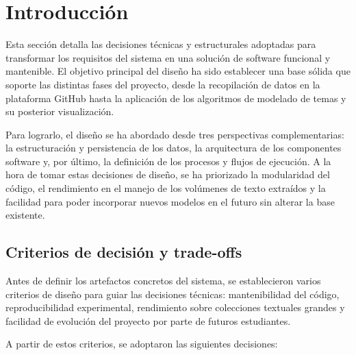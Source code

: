 
\section{Introducción}
Esta sección detalla las decisiones técnicas y estructurales adoptadas para
transformar los requisitos del sistema en una solución de software funcional y
mantenible. El objetivo principal del diseño ha sido establecer una base sólida
que soporte las distintas fases del proyecto, desde la recopilación de datos en
la plataforma GitHub hasta la aplicación de los algoritmos de modelado de temas
y su posterior visualización.

Para lograrlo, el diseño se ha abordado desde tres perspectivas
complementarias: la estructuración y persistencia de los datos, la arquitectura
de los componentes software y, por último, la definición de los procesos y
flujos de ejecución. A la hora de tomar estas decisiones de diseño, se ha
priorizado la modularidad del código, el rendimiento en el manejo de los
volúmenes de texto extraídos y la facilidad para poder incorporar nuevos
modelos en el futuro sin alterar la base existente.

\subsection{Criterios de decisión y trade-offs}
Antes de definir los artefactos concretos del sistema, se establecieron varios
criterios de diseño para guiar las decisiones técnicas: mantenibilidad del
código, reproducibilidad experimental, rendimiento sobre colecciones textuales
grandes y facilidad de evolución del proyecto por parte de futuros estudiantes.

A partir de estos criterios, se adoptaron las siguientes decisiones:

